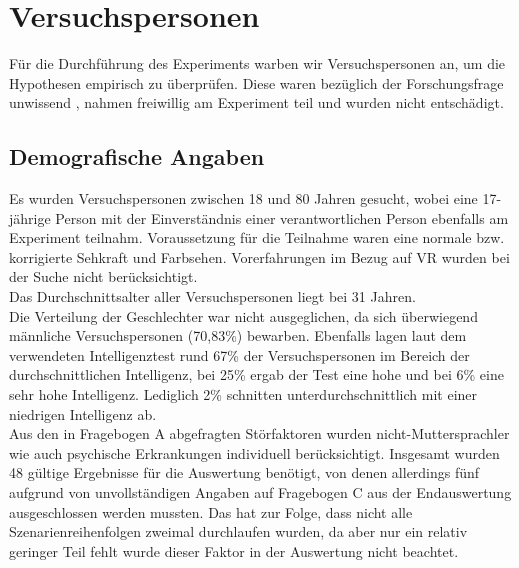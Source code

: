 \documentclass{Bericht}
\begin{document}
	\section{Versuchspersonen}
Für die Durchführung des Experiments warben wir Versuchspersonen an, um die Hypothesen empirisch zu überprüfen. 
Diese waren bezüglich der Forschungsfrage unwissend 
, nahmen freiwillig am Experiment teil und wurden nicht entschädigt. 

\subsection{Demografische Angaben}
Es wurden Versuchspersonen zwischen 18 und 80 Jahren gesucht, wobei eine 17-jährige Person mit der Einverständnis einer verantwortlichen Person ebenfalls am Experiment teilnahm. Voraussetzung für die Teilnahme waren eine normale bzw. korrigierte Sehkraft und Farbsehen. Vorerfahrungen im Bezug auf VR wurden bei der Suche nicht berücksichtigt.\\
Das Durchschnittsalter aller Versuchspersonen liegt bei 31 Jahren.\\
Die Verteilung der Geschlechter war nicht ausgeglichen, da sich überwiegend männliche Versuchspersonen (70,83\%) bewarben. Ebenfalls lagen laut dem verwendeten Intelligenztest rund 67\% der Versuchspersonen im Bereich der durchschnittlichen Intelligenz, bei 25\% ergab der Test eine hohe und bei 6\% eine sehr hohe Intelligenz. Lediglich 2\% schnitten unterdurchschnittlich mit einer niedrigen Intelligenz ab.\\
Aus den in Fragebogen A abgefragten Störfaktoren wurden nicht-Muttersprachler wie auch psychische Erkrankungen individuell berücksichtigt. 
Insgesamt wurden 48 gültige Ergebnisse für die Auswertung benötigt, von denen allerdings fünf aufgrund von unvollständigen Angaben auf Fragebogen C aus der Endauswertung ausgeschlossen werden mussten. Das hat zur Folge, dass nicht alle Szenarienreihenfolgen zweimal durchlaufen wurden, da aber nur ein relativ geringer Teil fehlt wurde dieser Faktor in der Auswertung nicht beachtet.
\end{document}
